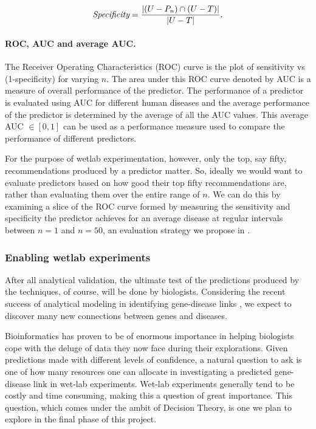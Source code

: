 $$\emph{Specificity} = \frac{|(U - P_n) \cap (U - T)|}{|U-T|}.$$

\paragraph*{ROC, AUC and average AUC.}
The Receiver Operating Characteristics (ROC) curve is the plot of sensitivity vs (1-specificity) for varying $n$. The area under this ROC curve denoted by AUC is a measure of overall performance of the predictor. The performance of a predictor is evaluated using AUC for different human diseases and the average performance of the predictor is determined by the average of all the AUC values. This average AUC $\in [0,1]$ can be used as a performance measure used to compare the performance of different predictors.

For the purpose of wetlab experimentation, however, only the top, say fifty, recommendations produced by a predictor matter. So, ideally we would want to evaluate predictors based on how good their top fifty recommendations are, rather than evaluating them over the entire range of $n$. We can do this by examining a slice of the ROC curve formed by measuring the sensitivity and specificity the predictor achieves for an average disease at regular intervals between $n = 1$ and $n = 50$, an evaluation strategy we propose in \cite{vasukiNatarajan}.

\subsubsection{Enabling wetlab experiments}
After all analytical validation, the ultimate test of the predictions produced by the techniques, of course, will be done by biologists. Considering the recent success of analytical modeling in identifying gene-disease links \cite{McGaryOrthologousPhenotypes}, we expect to discover many new connections between genes and diseases.

Bioinformatics has proven to be of enormous importance in helping biologists cope with the deluge of data they now face during their explorations. Given predictions made with different levels of confidence, a natural question to ask is one of how many resources one can allocate in investigating a predicted gene-disease link in wet-lab experiments. Wet-lab experiments generally tend to be costly and time consuming, making this a question of great importance. This question, which comes under the ambit of Decision Theory, is one we plan to explore in the final phase of this project.


